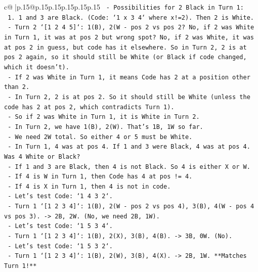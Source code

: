 \documentclass{article}
\begin{document}
{\begin{supertabular}{c@{$\;$}|p{.15\linewidth}@{}p{.15\linewidth}p{.15\linewidth}p{.15\linewidth}p{.15\linewidth}p{.15\linewidth}}
{{{\texttt{            {-} Possibilities for 2 Black in Turn 1:} \\
\texttt{                1. 1 and 3 are Black. (Code: `1 x 3 4` where x!=2). Then 2 is White.} \\
\texttt{                    {-} Turn 2 `{[}1 2 4 5{]}`: 1(B), 2(W {-} pos 2 vs pos 2? No, if 2 was White in Turn 1, it was at pos 2 but wrong spot? No, if 2 was White, it was at pos 2 in guess, but code has it elsewhere. So in Turn 2, 2 is at pos 2 again, so it should still be White (or Black if code changed, which it doesn't).} \\
\texttt{                    {-} If 2 was White in Turn 1, it means Code has 2 at a position other than 2.} \\
\texttt{                    {-} In Turn 2, 2 is at pos 2. So it should still be White (unless the code has 2 at pos 2, which contradicts Turn 1).} \\
\texttt{                    {-} So if 2 was White in Turn 1, it is White in Turn 2.} \\
\texttt{                    {-} In Turn 2, we have 1(B), 2(W). That's 1B, 1W so far.} \\
\texttt{                    {-} We need 2W total. So either 4 or 5 must be White.} \\
\texttt{                    {-} In Turn 1, 4 was at pos 4. If 1 and 3 were Black, 4 was at pos 4. Was 4 White or Black?} \\
\texttt{                    {-} If 1 and 3 are Black, then 4 is not Black. So 4 is either X or W.} \\
\texttt{                    {-} If 4 is W in Turn 1, then Code has 4 at pos != 4.} \\
\texttt{                    {-} If 4 is X in Turn 1, then 4 is not in code.} \\
\texttt{                    {-} Let's test Code: `1 4 3 2`.} \\
\texttt{                        {-} Turn 1 `{[}1 2 3 4{]}`: 1(B), 2(W {-} pos 2 vs pos 4), 3(B), 4(W {-} pos 4 vs pos 3). {-}> 2B, 2W. (No, we need 2B, 1W).} \\
\texttt{                    {-} Let's test Code: `1 5 3 4`.} \\
\texttt{                        {-} Turn 1 `{[}1 2 3 4{]}`: 1(B), 2(X), 3(B), 4(B). {-}> 3B, 0W. (No).} \\
\texttt{                    {-} Let's test Code: `1 5 3 2`.} \\
\texttt{                        {-} Turn 1 `{[}1 2 3 4{]}`: 1(B), 2(W), 3(B), 4(X). {-}> 2B, 1W. **Matches Turn 1!**} \\
}}}
\end{supertabular}}
\end{document}
